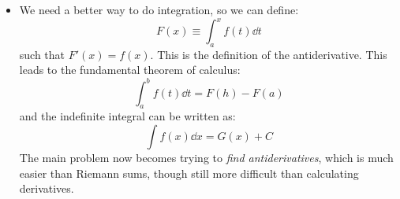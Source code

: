 \begin{itemize}
    \item We need a better way to do integration, so we can define:
    \begin{equation}
        F(x) \equiv \int_a^x f(t) \dd{t}
    \end{equation}
    such that $F'(x) = f(x)$. This is the definition of the antiderivative. This leads to the fundamental theorem of calculus:
    \begin{equation}
        \int_a^b f(t) \dd{t} = F(h) - F(a)
    \end{equation}
    and the indefinite integral can be written as:
    \begin{equation}
        \int f(x) \dd{x} = G(x) + C
    \end{equation}
    The main problem now becomes trying to \textit{find antiderivatives}, which is much easier than Riemann sums, though still more difficult than calculating derivatives.
\end{itemize}
